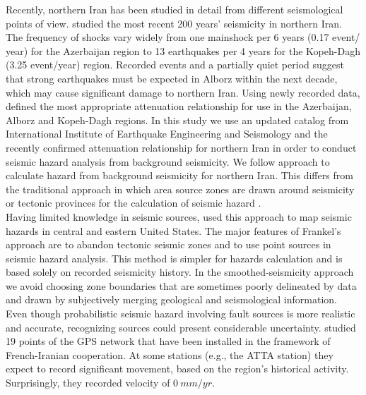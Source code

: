 \documentclass{article}
\begin{document}
\noindent
Recently, northern Iran has been studied in detail from different seismological points of view. \citet{Nemati2015} studied the most recent 200 years' seismicity in northern Iran. The frequency of shocks vary widely from one mainshock per 6 years (0.17 event/ year) for the Azerbaijan region to 13 earthquakes per 4 years for the Kopeh-Dagh (3.25 event/year) region. Recorded events and a partially quiet period suggest that strong earthquakes must be expected in Alborz within the next decade, which may cause significant damage to northern Iran. Using newly recorded data, \citet{Zafarani2014} defined the most appropriate attenuation relationship for use in the Azerbaijan, Alborz and Kopeh-Dagh regions. In this study we use an updated catalog from International Institute of Earthquake Engineering and Seismology \citep{IIEES} and the recently confirmed attenuation relationship for northern Iran \citep[i.e.,][]{Kalkan2004} in order to conduct seismic hazard analysis from background seismicity. We follow \citet{Frankel1995} approach to calculate hazard from background seismicity for northern Iran. This differs from the traditional approach in which area source zones are drawn around seismicity or tectonic provinces for the calculation of seismic hazard \citep{Cornell1968}. \\
\noindent
Having limited knowledge in seismic sources, \citet{Frankel1995} used this approach to map seismic hazards in central and eastern United States. The major features of Frankel's approach are to abandon tectonic seismic zones and to use point sources in seismic hazard analysis. This method is simpler for hazards calculation and is based solely on recorded seismicity history. In the smoothed-seismicity approach we avoid choosing zone boundaries that are sometimes poorly delineated by data and drawn by subjectively merging geological and seismological information. Even though probabilistic seismic hazard involving fault sources is more realistic and accurate, recognizing sources could present considerable uncertainty. \citet{Masson2006} studied 19 points of the GPS network that have been installed in the framework of French-Iranian cooperation. At some stations (e.g., the ATTA station) they expect to record significant movement, based on the region's historical activity.  Surprisingly, they recorded velocity of $0\  mm/yr$. \\
\noindent
\end{document}
